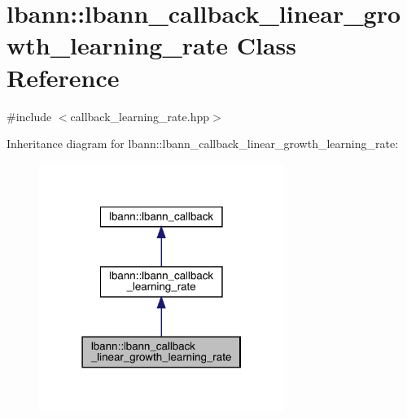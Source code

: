 \hypertarget{classlbann_1_1lbann__callback__linear__growth__learning__rate}{}\section{lbann\+:\+:lbann\+\_\+callback\+\_\+linear\+\_\+growth\+\_\+learning\+\_\+rate Class Reference}
\label{classlbann_1_1lbann__callback__linear__growth__learning__rate}


{\ttfamily \#include $<$callback\+\_\+learning\+\_\+rate.\+hpp$>$}



Inheritance diagram for lbann\+:\+:lbann\+\_\+callback\+\_\+linear\+\_\+growth\+\_\+learning\+\_\+rate\+:\nopagebreak
\begin{figure}[H]
\begin{center}
\leavevmode
\includegraphics[width=226pt]{classlbann_1_1lbann__callback__linear__growth__learning__rate__inherit__graph}
\end{center}
\end{figure}


